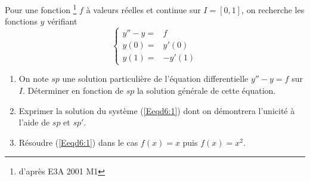 Pour une fonction \footnote{d'après E3A 2001 M1} $f$ à valeurs réelles et continue sur $I=[0,1]$, on recherche les fonctions $y$ vérifiant
\begin{equation}
\left\lbrace
\begin{aligned}
y''-y  = & f \\ 
y(0)  = & y'(0) \\ 
y(1)  = & -y'(1)
\end{aligned}
\right. \label{Eeqd6:1}
\end{equation}
\begin{enumerate}
\item On note $sp$ une solution particulière de l'équation differentielle $y''-y=f$ sur $I$. Déterminer en fonction de $sp$ la solution générale de cette équation.
\item Exprimer la solution du système (\ref{Eeqd6:1}) dont on démontrera l'unicité à l'aide de $sp$ et $sp'$.
\item Résoudre (\ref{Eeqd6:1}) dans le cas $f(x)=x$ puis $f(x)=x^2$.
\end{enumerate}
